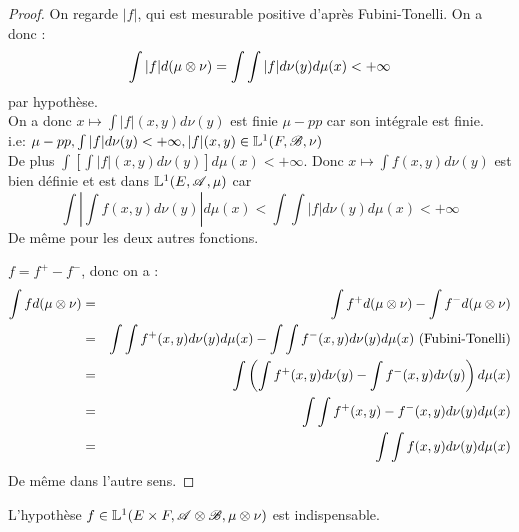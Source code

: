 \begin{proof} %
	On regarde $|f|$, qui est mesurable positive d'après Fubini-Tonelli. On a donc :
	$$ \int |f| d (\mu \otimes \nu) = \int \int |f| d \nu (y) d \mu (x) < + \infty$$
	par hypothèse. \\
	On a donc $ x   \mapsto \int |f|(x,y) d \nu(y)$ est finie $\mu-pp$ car son intégrale est finie. \\
	i.e: $\mu-pp, \int |f| d \nu(y) < + \infty, |f|(x,y) \in \mathbb{L}^1(F, \mathscr{B}, \nu)$ \\
	De plus $\int \left[ \int |f|(x,y) d    \nu(y)   \right] d \mu(x) < + \infty $.
	Donc $x \mapsto \int f (x,y) d \nu(y)$ est bien définie et est dans $\mathbb{L}^1(E, \mathscr{A}, \mu)$
	car $$\int \left| \int f (x,y) d \nu(y) \right| d \mu(x) < \int \int |f| d \nu(y) d \mu(x) < + \infty$$
	De même pour les deux autres fonctions.

	$f = f^+ - f^-$, donc on a :
	\begin{eqnarray*}
		\int f d (\mu \otimes \nu) & = & \int f^+ d (\mu \otimes \nu) - \int f^- d (\mu \otimes \nu) \\
		& = & \int \int f^+(x,y) d \nu(y) d \mu(x) - \int \int f^-(x,y) d \nu(y) d \mu(x) \text{ (Fubini-Tonelli)} \\
		& = & \int \left( \int f^+(x,y) d \nu(y) - \int f^-(x,y) d \nu(y) \right) d \mu(x) \\
		&=& \int \int f^+(x,y) - f^-(x,y) d \nu(y) d \mu(x) \\
		&=& \int \int f(x,y) d \nu(y) d \mu(x)
	\end{eqnarray*}
	De même dans l'autre sens.
\end{proof}

\begin{remarque}
	L'hypothèse $f \in \mathbb{L}^1(E \times F, \mathscr{A} \otimes \mathscr{B}, \mu \otimes \nu)$ est indispensable.
\end{remarque}
